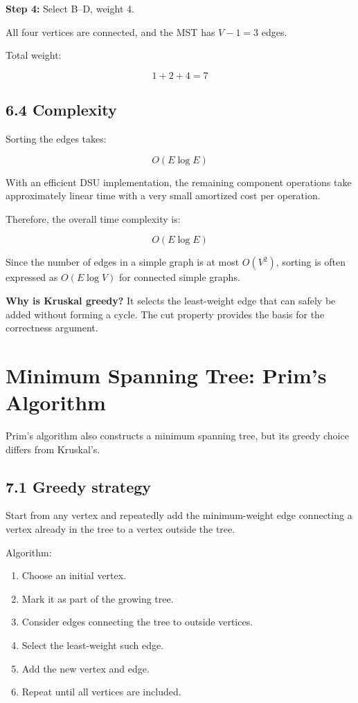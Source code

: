 \textbf{Step 4:} Select B--D, weight 4.

All four vertices are connected, and the MST has $V-1=3$ edges.

Total weight:


\[
1+2+4=\boxed{7}
\]


\subsection{6.4 Complexity}

Sorting the edges takes:


\[
O(E\log E)
\]


With an efficient DSU implementation, the remaining component operations take approximately linear time with a very small amortized cost per operation.

Therefore, the overall time complexity is:


\[
\boxed{O(E\log E)}
\]


Since the number of edges in a simple graph is at most $O(V^2)$, sorting is often expressed as $O(E\log V)$ for connected simple graphs.

\textbf{Why is Kruskal greedy?} It selects the least-weight edge that can safely be added without forming a cycle. The cut property provides the basis for the correctness argument.

\section{Minimum Spanning Tree: Prim's Algorithm}

Prim's algorithm also constructs a minimum spanning tree, but its greedy choice differs from Kruskal's.

\subsection{7.1 Greedy strategy}

Start from any vertex and repeatedly add the minimum-weight edge connecting a vertex already in the tree to a vertex outside the tree.

Algorithm:

\begin{enumerate}
    \item Choose an initial vertex.
    \item Mark it as part of the growing tree.
    \item Consider edges connecting the tree to outside vertices.
    \item Select the least-weight such edge.
    \item Add the new vertex and edge.
    \item Repeat until all vertices are included.
\end{enumerate}

